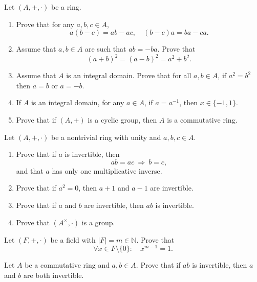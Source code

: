 \documentclass[
    11pt,a4paper,
]{exam}
\begin{document}
\begin{questions}
\question
Let $(A,+,\cdot)$ be a ring.
\begin{enumerate}[label=(\roman*)]
\item Prove that for any $a,b,c\in A$,
$$
a(b-c) = ab - ac,
\quad
(b-c)a = ba - ca.
$$
\item Assume that $a,b\in A$ are such that $ab=-ba$. Prove that 
$$
(a+b)^2 = (a-b)^2 = a^2 + b^2.
$$
\item Assume that $A$ is an integral domain. Prove that for all \(a,b\in A\), if \(a^2 = b^2\) then \(a=b\) or \(a=-b\).
\item If \(A\) is an integral domain, for any \(a\in A\), if  \(a=a^{-1}\), then \(x \in \{-1,1\}\). 
\item Prove that if $(A,+)$ is a cyclic group, then $A$ is a commutative ring.
\end{enumerate}





\question
\label{ej:ejercicior2}
Let $(A,+,\cdot)$ be a nontrivial ring with unity and $a,b,c\in A$.
\begin{enumerate}[label=(\roman*)]
\item Prove that if $a$ is invertible, then 
$$
ab = ac \: \Rightarrow \: b=c,
$$
and that $a$ has only one multiplicative inverse.
%
\item Prove that if $a^2 = 0$, then $a+1$ and $a-1$ are invertible. 
\item Prove that if $a$ and $b$ are invertible, then $ab$ is invertible.
\item Prove that $(A^\times,\cdot)$ is a group.
\end{enumerate}


\question
Let $(F,+,\cdot)$ be a field with $|F|=m\in \mathbb{N}$. Prove that
\begin{equation}
\forall x\in F\setminus \{0\}:\quad
x^{m-1} = 1.
\end{equation}


\question
Let $A$ be a commutative ring and $a,b\in A$. Prove that if $ab$ is invertible, then $a$ and $b$ are both invertible.




\end{questions}
\end{document}

